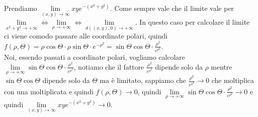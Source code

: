\begin{example}
Prendiamo $\lim\limits_{(x,y)\to \infty}xye^{-(x^2 + y^2)}$. Come sempre vale che il limite vale per $\lim\limits_{x^2 + y^2\to +\infty} \Longleftrightarrow \lim\limits_{\rho\to +\infty} \Longleftrightarrow \lim\limits_{d((x,y),0)\to +\infty}$. In questo caso per calcolare il limite ci viene comodo passare alle coordinate polari, quindi $f(\rho, \Theta) = \rho\cos{\Theta}\cdot \rho\sin{\Theta} \cdot e^{-\rho^2} = \sin{\Theta}\cos{\Theta} \cdot \frac{\rho^2}{e^{\rho^2}}$.\\
Noi, essendo passati a coordinate polari, vogliamo calcolare $\lim\limits_{\rho \to +\infty}\sin{\Theta}\cos{\Theta} \cdot \frac{\rho^2}{e^{\rho^2}}$, notiamo che il fattore $\frac{\rho^2}{e^{\rho^2}}$ dipende solo da $\rho$ mentre $\sin{\Theta}\cos{\Theta}$ dipende solo da $\Theta$ ma è limitato, sappiamo che $\frac{\rho^2}{e^{\rho^2}}\to 0$ che moltiplica con una moltiplicata e quindi $f(\rho,\Theta) \to 0$, quindi $\lim\limits_{\rho \to +\infty}\sin{\Theta}\cos{\Theta} \cdot \frac{\rho^2}{e^{\rho^2}} \to 0$ e quindi $\lim\limits_{(x,y)\to \infty}xye^{-(x^2 + y^2)} \to 0$.
\end{example}

